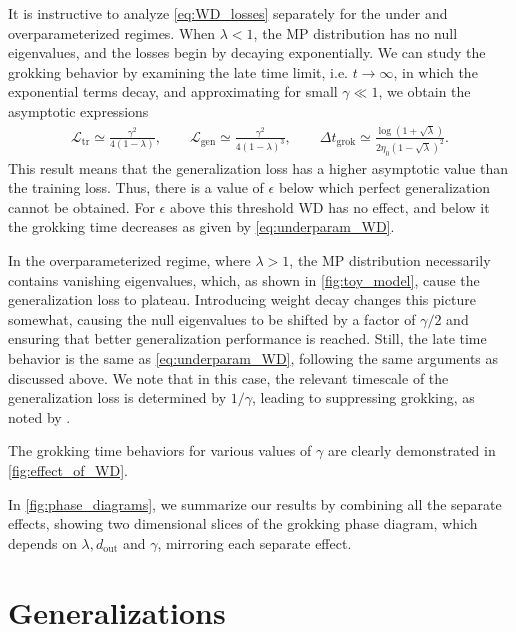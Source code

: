 \documentclass[a4paper,11pt]{article}
\newcommand{\dout}{d_\mathrm{out}}
\newcommand{\training}{\mathrm{tr}}
\newcommand{\gen}{\mathrm{gen}}
\newcommand{\mcL}{\mathcal{L}}
\begin{document}
It is instructive to analyze \cref{eq:WD_losses} separately for the under and overparameterized regimes. When $\lambda<1$, the MP distribution has no null eigenvalues, and the losses begin by decaying exponentially. We can study the grokking behavior by examining the late time limit, i.e. $t\to\infty$, in which the exponential terms decay, and approximating for small $\gamma \ll 1$, we obtain the asymptotic expressions
\begin{align}
\label{eq:underparam_WD}
    \mcL_\training \simeq
    \frac{\gamma ^2}{4(1- \lambda )},
    \qquad
    \mcL_\gen
    \simeq
    \frac{\gamma ^2}{4 (1-\lambda )^3}
    , \qquad
    \Delta t_\mathrm{grok}
    \simeq
    \tfrac{\log 
    \left(
    1 + \sqrt{\lambda }
    \right)}{2 \eta _0 \left(1-\sqrt{\lambda }\right)^2}.
\end{align}
This result means that the generalization loss has a higher asymptotic value than the training loss. Thus, there is a value of $\epsilon$ below which perfect generalization cannot be obtained. For $\epsilon$ above this threshold WD has no effect, and below it the grokking time decreases as given by \cref{eq:underparam_WD}.

In the overparameterized regime, where $\lambda>1$, the MP distribution necessarily contains vanishing eigenvalues, which, as shown in \cref{fig:toy_model}, cause the generalization loss to plateau. Introducing weight decay changes this picture somewhat, causing the null eigenvalues to be shifted by a factor of $\gamma/2$ and ensuring that better generalization performance is reached. Still, the late time behavior is the same as \cref{eq:underparam_WD}, following the same arguments as discussed above. We note that in this case, the relevant timescale of the generalization loss is determined by $1/\gamma$, leading to suppressing grokking, as noted by \cite{liu2023omnigrok}.


The grokking time behaviors for various values of $\gamma$ are clearly demonstrated in \cref{fig:effect_of_WD}.

In \cref{fig:phase_diagrams}, we summarize our results by combining all the separate effects, showing two dimensional slices of the grokking phase diagram, which depends on $\lambda,\dout$ and $\gamma$, mirroring each separate effect. 




\section{Generalizations}
\end{document}
